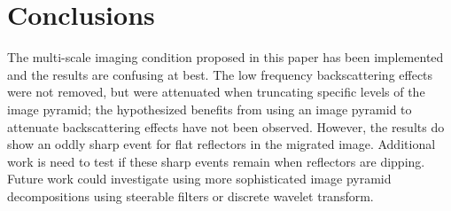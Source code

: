 \section{Conclusions}

The multi-scale imaging condition proposed in this paper has been implemented and the results are confusing at best.  The low frequency backscattering effects were not removed, but were attenuated when truncating specific levels of the image pyramid; the hypothesized benefits from using an image pyramid to attenuate backscattering effects have not been observed.  However, the results do show an oddly sharp event for flat reflectors in the migrated image.  Additional work is need to test if these sharp events remain when reflectors are dipping.  Future work could investigate using more sophisticated image pyramid decompositions using steerable filters or discrete wavelet transform.





%






